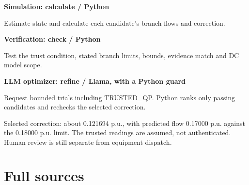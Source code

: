 \documentclass[12pt,letterpaper]{article}
\begin{document}
\textbf{Simulation: calculate /\allowbreak{} Python}\par Estimate state and calculate each candidate's branch flows and correction.\par\medskip
\textbf{Verification: check /\allowbreak{} Python}\par Test the trust condition, stated branch limits, bounds, evidence match and DC model scope.\par\medskip
\textbf{LLM optimizer: refine /\allowbreak{} Llama, with a Python guard}\par Request bounded trials including TRUSTED\_\allowbreak{}QP. Python ranks only passing candidates and rechecks the selected correction.\par\medskip
Selected correction: about 0.121694 p.u., with predicted flow 0.17000 p.u. against the 0.18000 p.u. limit. The trusted readings are assumed, not authenticated. Human review is still separate from equipment dispatch.\par
\clearpage\section*{Full sources}
\end{document}
